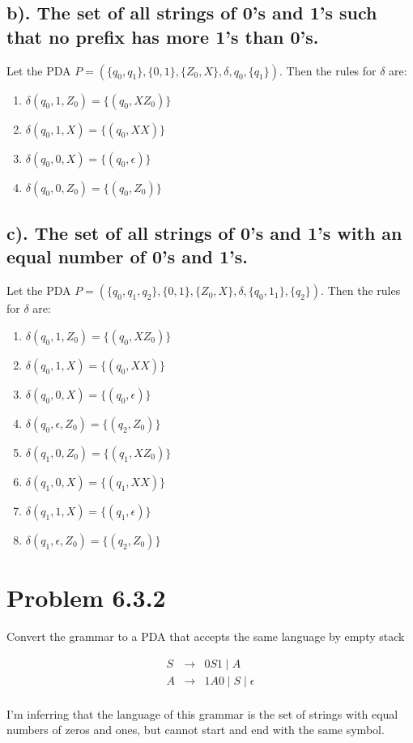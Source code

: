 \documentclass[20pt]{article} %
\begin{document}
\subsection{b). The set of all strings of 0's and 1's such that no prefix has more 1's than 0's.}
Let the PDA $\!P = (\{q_0, q_1\}, \{0,1\}, \{Z_0, X\}, \delta, q_0, \{q_1\})$. Then the rules for $\delta$ are: \\
\begin{enumerate}
\item $\delta(q_0, 1, Z_0) = \{(q_0, XZ_0)\}$
\item $\delta(q_0, 1, X) = \{(q_0, XX)\}$
\item $\delta(q_0, 0, X) = \{(q_0, \epsilon)\}$
\item $\delta(q_0, 0, Z_0) = \{(q_0, Z_0)\}$
\end{enumerate}
\newpage
\subsection{c). The set of all strings of 0's and 1's with an equal number of 0's and 1's.}
Let the PDA $\!P = (\{q_0, q_1, q_2\}, \{0,1\}, \{Z_0, X\}, \delta, \{q_0, 1_1\}, \{q_2\})$. Then the rules for $\delta$ are: \\
\begin{enumerate}
\item $\delta(q_0, 1, Z_0) = \{(q_0, XZ_0)\}$
\item $\delta(q_0, 1, X) = \{(q_0, XX)\}$
\item $\delta(q_0, 0, X) = \{(q_0, \epsilon)\}$
\item $\delta(q_0, \epsilon, Z_0) = \{(q_2, Z_0)\}$
\item $\delta(q_1, 0, Z_0) = \{(q_1, XZ_0)\}$
\item $\delta(q_1, 0, X) = \{(q_1, XX)\}$
\item $\delta(q_1, 1, X) = \{(q_1, \epsilon)\}$
\item $\delta(q_1, \epsilon, Z_0) = \{(q_2, Z_0)\}$
\end{enumerate}
\section{Problem 6.3.2}
Convert the grammar to a PDA that accepts the same language by empty stack
 \begin{table}[!htbp]
 \[\begin{array}{ccc} 
 S & \rightarrow & 0S1 \mid A \\
 A & \rightarrow & 1A0 \mid S \mid \epsilon \\
 \end{array}\]
 \end{table}
I'm inferring that the language of this grammar is the set of strings with equal numbers of zeros and ones, but cannot start and end with the same symbol.
\end{document}
